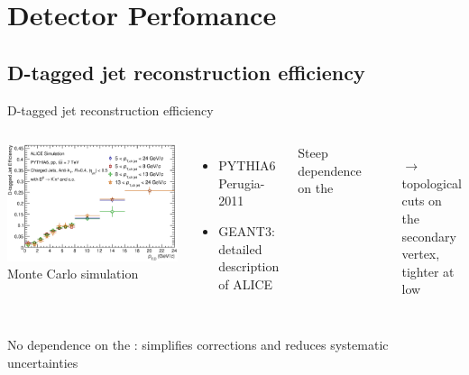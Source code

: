 \documentclass{beamer}
\begin{document}
\section{Detector Perfomance}

\subsection{D-tagged jet reconstruction efficiency}
\begin{frame}{D-tagged jet reconstruction efficiency}

\begin{columns}
\includegraphics[width=\textwidth]{img/HQ16_Simulation_EfficiencyVsDPt}
Monte Carlo simulation
\begin{itemize}
\item PYTHIA6 Perugia-2011
\item GEANT3: detailed description of ALICE
\end{itemize}
\bigskip
\alert{Steep dependence on the \ptd}
\begin{itemize}
\item[$\rightarrow$] topological cuts on the secondary vertex, tighter at low \ptd\
\end{itemize}
\end{columns}
\bigskip
\alert{No dependence on the \ptchjet}: simplifies corrections and reduces systematic uncertainties 
\end{frame}
\end{document}
